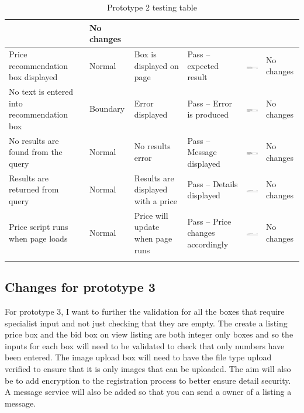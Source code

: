 \begin{center}
\begin{longtable}{|P{17mm}|P{17mm}|P{16mm}|P{17mm}|P{40mm}|P{21.5mm}|}
& No changes \\ \hline
Price recommendation box displayed & Normal & Box is displayed on page &
Pass -- expected result &
\includegraphics[width=38mm]{ch3_developing/proto2/media/image20.png}
& No changes \\ \hline
No text is entered into recommendation box & Boundary & Error displayed
& Pass -- Error is produced &
\includegraphics[width=38mm]{ch3_developing/proto2/media/image21.png}
& No changes \\ \hline
No results are found from the query & Normal & No results error & Pass
-- Message displayed &
\includegraphics[width=38mm]{ch3_developing/proto2/media/image22.png}
& No changes \\ \hline
Results are returned from query & Normal & Results are displayed with a
price & Pass -- Details displayed &
\includegraphics[width=38mm]{ch3_developing/proto2/media/image23.png}
& No changes \\ \hline
Price script runs when page loads & Normal & Price will
update when page runs & Pass -- Price changes accordingly &
\includegraphics[width=38mm]{ch3_developing/proto2/media/image24.png}
& No changes \\ \hline

    \caption{Prototype 2 testing table}
\label{tab:proto2_testing}
\end{longtable}
\end{center}

\subsection{Changes for prototype 3}
For prototype 3, I want to further the validation for all the boxes that require specialist input and not just checking that they are empty. The create a listing price box and the bid box on view listing are both integer only boxes and so the inputs for each box will need to be validated to check that only numbers have been entered. The image upload box will need to have the file type upload verified to ensure that it is only images that can be uploaded. The aim will also be to add encryption to the registration process to better ensure detail security. A message service will also be added so that you can send a owner of a listing a message.  
